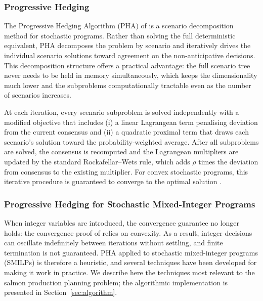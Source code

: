 \documentclass[12pt,a4paper]{article}
\begin{document}
 
\subsubsection{Progressive Hedging}
\label{sec:ph}

The Progressive Hedging Algorithm (PHA) of \citet{rockafellar1991scenarios}
is a scenario decomposition method for stochastic programs. Rather than
solving the full deterministic equivalent, PHA decomposes the problem by
scenario and iteratively drives the individual scenario solutions toward
agreement on the non-anticipative decisions. This decomposition structure
offers a practical advantage: the full scenario tree never needs to be held
in memory simultaneously, which keeps the dimensionality much lower and
the subproblems computationally tractable even as the number of scenarios
increases.

At each iteration, every scenario subproblem is solved independently with
a modified objective that includes (i) a linear Lagrangean term penalising
deviation from the current consensus and (ii) a quadratic proximal term
that draws each scenario's solution toward the probability-weighted
average. After all subproblems are solved, the consensus is recomputed and
the Lagrangean multipliers are updated by the standard Rockafellar--Wets
rule, which adds $\rho$ times the deviation from consensus to the existing
multiplier. For convex stochastic programs, this iterative procedure is
guaranteed to converge to the optimal solution
\citep{rockafellar1991scenarios}.

\subsubsection{Progressive Hedging for Stochastic Mixed-Integer Programs}
\label{sec:ph_milp}

When integer variables are introduced, the convergence guarantee no
longer holds: the convergence proof of \citet{rockafellar1991scenarios}
relies on convexity. As a result, integer decisions can oscillate
indefinitely between iterations without settling, and finite
termination is not guaranteed. PHA applied to stochastic mixed-integer
programs (SMILPs) is therefore a heuristic, and several techniques
have been developed for making it work in practice. We describe here
the techniques most relevant to the salmon production planning
problem; the algorithmic implementation is presented in
Section~\ref{sec:algorithm}.
\end{document}
